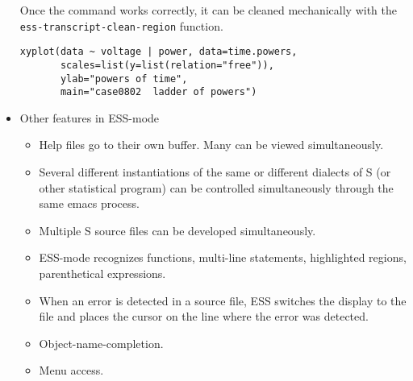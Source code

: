 \documentclass[12pt]{article}   %
\begin{document}
\begin{itemize}
Once the command works correctly, it can be cleaned mechanically with
the {\tt ess-transcript-clean-region} function.

\begin{verbatim}
xyplot(data ~ voltage | power, data=time.powers,
       scales=list(y=list(relation="free")),
       ylab="powers of time",
       main="case0802  ladder of powers")
\end{verbatim}

\newpage
\item
Other features in ESS-mode

\begin{itemize}
\item Help files go to their own buffer.  Many can be viewed simultaneously.
\item Several different instantiations of the same or different dialects of S (or other
statistical program) can be controlled simultaneously through the same emacs process.
\item Multiple S source files can be developed simultaneously.
\item ESS-mode recognizes functions, multi-line statements,
highlighted regions, parenthetical expressions.
\item When an error is detected in a source file, ESS switches the display to the file and
places the cursor on the line where the error was detected.
\item Object-name-completion.
\item Menu access.
\end{itemize}

\end{itemize}
\end{document}
